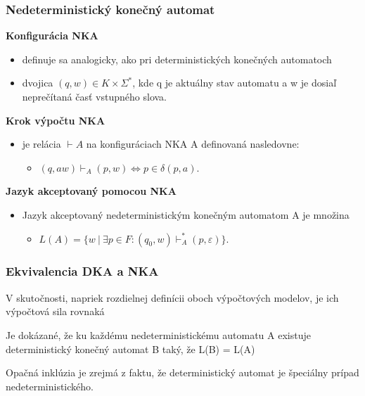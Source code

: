 \documentclass{beamer}
\begin{document}
\begin{frame}
\frametitle{Nedeterministický konečný automat}

\textbf{Konfigurácia NKA}
\begin{itemize}
\item{definuje sa  analogicky, ako pri deterministických konečných automatoch}
\item dvojica $(q,w)\in K\times \Sigma ^{\ast }$, kde q je aktuálny stav automatu a w je dosiaľ neprečítaná časť vstupného slova.
\end{itemize}
\textbf{Krok výpočtu NKA}
\begin{itemize}
\item{je relácia  $\vdash A $ na konfiguráciach NKA A definovaná nasledovne:}
\begin{itemize}
\item $(q,aw)\vdash _{A}(p,w)\iff p\in \delta (p,a).$
\end{itemize}
\end{itemize}
\textbf{Jazyk akceptovaný pomocou NKA}
\begin{itemize}
\item Jazyk akceptovaný nedeterministickým konečným automatom A je množina
\begin{itemize}

\item $L(A)=\{w\ |\ \exists p\in F:(q_{0},w)\vdash _{A}^*(p,\varepsilon )\}.$

\end{itemize}
\end{itemize}


\end{frame}
\begin{frame}
\frametitle{Ekvivalencia DKA a NKA}
\begin{itemize}
\item{V skutočnosti, napriek rozdielnej definícii oboch výpočtových modelov, je ich výpočtová sila rovnaká
\item Je dokázané, že ku každému nedeterministickému automatu A existuje deterministický konečný automat B taký, že L(B) = L(A)
\item  Opačná inklúzia je zrejmá z faktu, že deterministický automat je špeciálny prípad nedeterministického.}
\end{itemize}
\end{frame}
\end{document}
